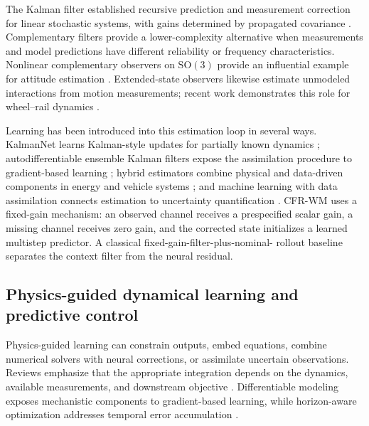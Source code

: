 \documentclass[pdflatex,sn-basic]{sn-jnl}
\begin{document}
The Kalman filter established recursive prediction and measurement correction
for linear stochastic systems, with gains determined by propagated covariance
\citep{kalman1960_filtering}. Complementary filters provide a lower-complexity
alternative when measurements and model predictions have different reliability
or frequency characteristics. Nonlinear complementary observers on
$\mathrm{SO}(3)$ provide an influential example for attitude estimation
\citep{mahony2008_complementary}. Extended-state observers likewise estimate
unmodeled interactions from motion measurements; recent work demonstrates
this role for wheel--rail dynamics \citep{zhao2023_wheel_rail_observer}.

Learning has been introduced into this estimation loop in several ways.
KalmanNet learns Kalman-style updates for partially known dynamics
\citep{revach2022_kalmannet}; autodifferentiable ensemble Kalman filters expose
the assimilation procedure to gradient-based learning
\citep{chen2022_autodifferentiable_enkf}; hybrid estimators combine physical and data-driven
components in energy and vehicle systems
\citep{chen2022_hybrid_physics_data_driven_online,chen2023_hybrid_physics_and_data_driven};
and machine learning with data assimilation connects estimation to uncertainty
quantification \citep{cheng2023_machine_learning_with_data_assimilation}. CFR-WM
uses a fixed-gain mechanism: an observed channel receives a prespecified scalar
gain, a missing channel receives zero gain, and the corrected state initializes
a learned multistep predictor. A classical fixed-gain-filter-plus-nominal-
rollout baseline separates the context filter from the neural residual.

\subsection{Physics-guided dynamical learning and predictive control}

Physics-guided learning can constrain outputs, embed equations, combine
numerical solvers with neural corrections, or assimilate uncertain
observations. Reviews emphasize that the appropriate integration depends on the
dynamics, available measurements, and downstream objective
\citep{cuomo2022_scientific_machine_learning_through_physics,bradley2022_perspectives_on_the_integration_between,yu2024_learning_dynamical_systems_from_data}.
Differentiable modeling exposes mechanistic components to gradient-based
learning, while horizon-aware optimization addresses temporal error
accumulation
\citep{shen2023_differentiable_modelling_to_unify_machine,wang2024_respecting_causality_for_training_physics,list2022_learned_turbulence_modelling_with_differentiable}.
\end{document}
